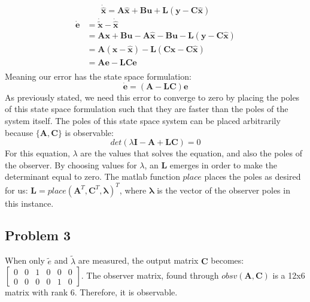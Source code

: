 \begin{equation*}
  \dot{\hat{\bm{x}}} = \bm{A}\hat{\bm{x}}+\bm{B}\bm{u} + \bm{L}(\bm{y}
  - \bm{C}\hat{\bm{x}})
\end{equation*}
\begin{align*}
  \dot{\bm{e}} &= \dot{\bm{\tilde{x}}} - \dot{\hat{\bm{x}}} \\
							 &= \bm{Ax} + \bm{Bu} - \bm{A}\hat{\bm{x}} - \bm{Bu} - \bm{L}(\bm{y}- \bm{C}\hat{\bm{x}}) \\
							 &= \bm{A}(\bm{x} - \hat{\bm{x}}) - \bm{L}(\bm{C}\bm{x}- \bm{C}\hat{\bm{x}}) \\
							 &= \bm{Ae} - \bm{LCe} \\
\end{align*}
Meaning our error has the state space formulation:
\begin{equation}
	\dot{\bm{e}} = (\bm{A} - \bm{LC})\bm{e}
\end{equation}
As previously stated, we need this error to converge to zero by placing the poles of this state space formulation such that they are faster than the poles of the system itself. The poles of this state space system can be placed arbitrarily because $\{\bm{A},\bm{C}\}$ is observable:
\begin{equation*}
det(\lambda\bm{I} - \bm{A} +\bm{LC}) = 0
\end{equation*}
For this equation, $\lambda$ are the values that solves the equation, and also the poles of the observer. By choosing values for $\lambda$, an $\bm{L}$ emerges in order to make the determinant equal to zero. The matlab function $place$ places the poles as desired for us: $\bm{L} = place(\bm{A}^T,\bm{C}^T,\bm{\lambda})^T$, where $\bm{\lambda}$ is the vector of the observer poles in this instance.

\subsection{Problem 3}
When only $\tilde{e}$ and $\tilde{\lambda}$ are measured, the output
matrix $\bm{C}$ becomes:
$\begin{bmatrix}
  0 & 0 & 1 & 0 & 0 & 0 \\
  0 & 0 & 0 & 0 & 1 & 0
\end{bmatrix}$.
The observer matrix, found through $obsv(\bm{A},\bm{C})$ is a 12x6
matrix with rank 6. Therefore, it is observable.

